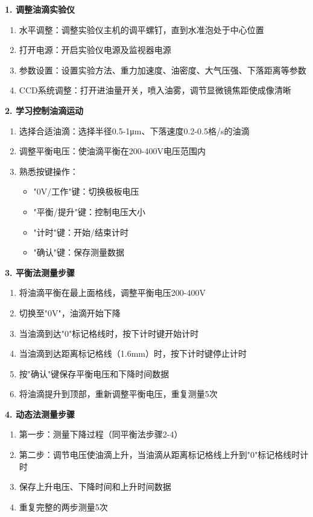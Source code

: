 \documentclass[dvipsnames, svgnames,a4paper,11pt]{article}
\begin{document}
\textbf{1. 调整油滴实验仪}
\begin{enumerate}
	\item 水平调整：调整实验仪主机的调平螺钉，直到水准泡处于中心位置
	\item 打开电源：开启实验仪电源及监视器电源
	\item 参数设置：设置实验方法、重力加速度、油密度、大气压强、下落距离等参数
	\item CCD系统调整：打开进油量开关，喷入油雾，调节显微镜焦距使成像清晰
\end{enumerate}

\textbf{2. 学习控制油滴运动}
\begin{enumerate}
	\item 选择合适油滴：选择半径0.5-1μm、下落速度0.2-0.5格/s的油滴
	\item 调整平衡电压：使油滴平衡在200-400V电压范围内
	\item 熟悉按键操作：
	   \begin{itemize}
	   \item "0V/工作"键：切换极板电压
	   \item "平衡/提升"键：控制电压大小
	   \item "计时"键：开始/结束计时
	   \item "确认"键：保存测量数据
	   \end{itemize}
\end{enumerate}

\textbf{3. 平衡法测量步骤}
\begin{enumerate}
	\item 将油滴平衡在最上面格线，调整平衡电压200-400V
	\item 切换至"0V"，油滴开始下降
	\item 当油滴到达"0"标记格线时，按下计时键开始计时
	\item 当油滴到达距离标记格线（1.6mm）时，按下计时键停止计时
	\item 按"确认"键保存平衡电压和下降时间数据
	\item 将油滴提升到顶部，重新调整平衡电压，重复测量5次
\end{enumerate}

\textbf{4. 动态法测量步骤}
\begin{enumerate}
	\item 第一步：测量下降过程（同平衡法步骤2-4）
	\item 第二步：调节电压使油滴上升，当油滴从距离标记格线上升到"0"标记格线时计时
	\item 保存上升电压、下降时间和上升时间数据
	\item 重复完整的两步测量5次
\end{enumerate}
\end{document}
